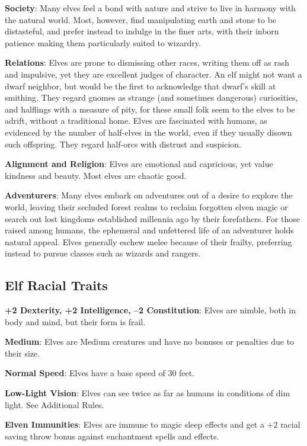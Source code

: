 \textbf{Society}: Many elves feel a bond with nature and strive to live in harmony with the natural world. Most, however, find manipulating earth and stone to be distasteful, and prefer instead to indulge in the finer arts, with their inborn patience making them particularly suited to wizardry.
				
\textbf{Relations}: Elves are prone to dismissing other races, writing them off as rash and impulsive, yet they are excellent judges of character. An elf might not want a dwarf neighbor, but would be the first to acknowledge that dwarf's skill at smithing. They regard gnomes as strange (and sometimes dangerous) curiosities, and halflings with a measure of pity, for these small folk seem to the elves to be adrift, without a traditional home. Elves are fascinated with humans, as evidenced by the number of half-elves in the world, even if they usually disown such offspring. They regard half-orcs with distrust and suspicion.
				
\textbf{Alignment and Religion}: Elves are emotional and capricious, yet value kindness and beauty. Most elves are chaotic good. 
				
\textbf{Adventurers}: Many elves embark on adventures out of a desire to explore the world, leaving their secluded forest realms to reclaim forgotten elven magic or search out lost kingdoms established millennia ago by their forefathers. For those raised among humans, the ephemeral and unfettered life of an adventurer holds natural appeal. Elves generally eschew melee because of their frailty, preferring instead to pursue classes such as wizards and rangers.
											
\subsection{Elf Racial Traits}

				
\textbf{+2 Dexterity, +2 Intelligence, --2 Constitution}: Elves are nimble, both in body and mind, but their form is frail.
				
\textbf{Medium}: Elves are Medium creatures and have no bonuses or penalties due to their size.
				
\textbf{Normal Speed}: Elves have a base speed of 30 feet.
				
\textbf{Low-Light Vision}: Elves can see twice as far as humans in conditions of dim light. See Additional Rules.
				
\textbf{Elven Immunities}: Elves are immune to magic sleep effects and get a +2 racial saving throw bonus against enchantment spells and effects.
				
